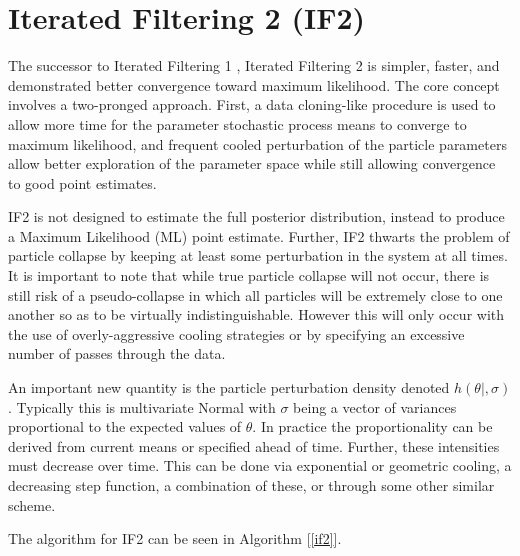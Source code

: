 \section{Iterated Filtering 2 (IF2)}

	The successor to Iterated Filtering 1 \cite{Ionides2006}, Iterated Filtering 2 \cite{Ionides2015} is simpler, faster, and demonstrated better convergence toward maximum likelihood. The core concept involves a two-pronged approach. First, a data cloning-like procedure is used to allow more time for the parameter stochastic process means to converge to maximum likelihood, and frequent cooled perturbation of the particle parameters allow better exploration of the parameter space while still allowing convergence to good point estimates.

	IF2 is not designed to estimate the full posterior distribution, instead to produce a Maximum Likelihood (ML) point estimate. Further, IF2 thwarts the problem of particle collapse by keeping at least some perturbation in the system at all times. It is important to note that while true particle collapse will not occur, there is still risk of a pseudo-collapse in which all particles will be extremely close to one another so as to be virtually indistinguishable. However this will only occur with the use of overly-aggressive cooling strategies or by specifying an excessive number of passes through the data.

	An important new quantity is the particle perturbation density denoted $h(\theta|,\sigma)$. Typically this is multivariate Normal with $\sigma$ being a vector of variances proportional to the expected values of $\theta$. In practice the proportionality can be derived from current means or specified ahead of time. Further, these intensities must decrease over time. This can be done via exponential or geometric cooling, a decreasing step function, a combination of these, or through some other similar scheme.

	The algorithm for IF2 can be seen in Algorithm [\ref{if2}].\\

